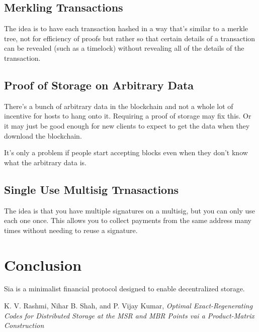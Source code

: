 \documentclass[twocolumn]{article}
\begin{document}
\subsection{Merkling Transactions}
The idea is to have each transaction hashed in a way that's similar to a merkle tree, not for efficiency of proofs but rather so that certain details of a transaction can be revealed (such as a timelock) without revealing all of the details of the transaction.

\subsection{Proof of Storage on Arbitrary Data}
There's a bunch of arbitrary data in the blockchain and not a whole lot of incentive for hosts to hang onto it.
Requiring a proof of storage may fix this.
Or it may just be good enough for new clients to expect to get the data when they download the blockchain.

It's only a problem if people start accepting blocks even when they don't know what the arbitrary data is.

\subsection{Single Use Multisig Trnasactions}
The idea is that you have multiple signatures on a multisig, but you can only use each one once.
This allows you to collect payments from the same address many times without needing to reuse a signature.

\section{Conclusion}
Sia is a minimalist financial protocol designed to enable decentralized storage.

\onecolumn
\begin{bibliography}{1}

	K. V. Rashmi, Nihar B. Shah, and P. Vijay Kumar,
	\emph{Optimal Exact-Regenerating Codes for Distributed Storage at the MSR and MBR Points vai a Product-Matrix Construction}

\end{bibliography}
\end{document}
